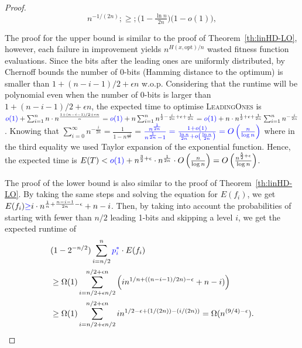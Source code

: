 \documentclass[lettersize,journal]{IEEEtran}
\begin{document}
\begin{proof}
	
	$$ n^{-1/(2n)} ;\ge; \bigl(1-\tfrac{\ln n}{2n}\bigr)\bigl(1-o(1)\bigr), $$ 
	
The proof for the upper bound is similar to the proof of Theorem~\ref{th:linHD-LO}, however, each 
failure in improvement yields $n^{H(x, \text{opt})/n}$ wasted fitness function evaluations. 
Since the bits after the leading ones are uniformly distributed, by Chernoff bounds the number 
of 0-bits (Hamming distance to the optimum) is smaller than  $1+(n-i-1)/2+\epsilon n$ 
w.o.p. {\color{blue}Considering that the runtime will be polynomial even when the number of $0$-bits is larger than $1+(n-i-1)/2+\epsilon n$}, the expected time to optimise \textsc{LeadingOnes} is ${\color{blue}o(1)}+\sum_{i=1}^{n} n \cdot 
n^{\frac{1+(n-i-1)/2+\epsilon n}{n}}= {\color{blue}o(1)}+n \sum_{i=1}^{n} 
n^{\frac{1}{2}-\frac{i}{2n}+\epsilon+\frac{1}{2n}}={\color{blue}o(1)}+n \cdot n^{\frac{1}{2}+\epsilon+\frac{1}{2n}} \sum_{i=1}^{n} 
n^{-\frac{i}{2n}}$. Knowing that 
$\sum_{i=0}^{\infty}n^{-\frac{i}{2n}}=\frac{1}{1-n^{\frac{-1}{2n}}}=${$\color{blue} \frac{n^{\frac{1}{2n}}}{n^{\frac{1}{2n}} - 1} = \frac{1 + o(1)}{\frac{\ln{n}}{2n} + o\left(\frac{\ln{n}}{2n}\right)} = O\left(\frac{n}{\log{n}}\right)$ where in the third equality we used Taylor expansion of the exponential function.}  Hence, the expected time is $E(T) 
< {\color{blue}o(1)}+n^{\frac{3}{2}+\epsilon} \cdot n^{\frac{1}{2n}} \cdot O\left(\frac{n}{\log n}\right)=O\left(\frac{n^{\frac{5}{2}+\epsilon}}{\log n}\right)$.



The proof of the lower bound is also similar to the proof of Theorem~\ref{th:linHD-LO}. 
By taking the same steps and solving the equation for $E(f_i)$, we get
$E(f_i){\color{blue}\ge} i \cdot n^{\frac{1}{n}+\frac{n-i-1}{2n}-\epsilon}+n-i$. Then, by taking into account the probabilities of starting with fewer than $n/2$ leading 1-bits and skipping a level $i$, we get the expected runtime of 
\begin{align*}
&(1-2^{-n/2})\sum_{i=n/2}^{n} {\color{blue}p_{i}^{*}} \cdot E(f_i)\\
&\geq \Omega(1) \sum_{i=n/2+\epsilon 
	n/2}^{n/2+\epsilon n} 
\left( i n^{1/n+((n-i-1)/2n)-\epsilon}+n-i )\right)\\
&\geq \Omega(1) \sum_{i=n/2+\epsilon 
	n/2}^{n/2+\epsilon n}  in^{1/2-\epsilon+(1/(2n))-(i/(2n))}= \Omega(n^{(9/4)-\epsilon}).
	\end{align*} 
\end{proof}
\end{document}
